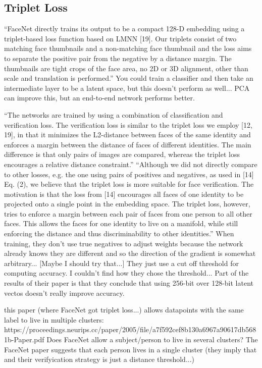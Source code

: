 \subsection{Triplet Loss}
``FaceNet directly trains
its output to be a compact 128-D embedding using a triplet-based loss function based on LMNN [19]. Our triplets consist of two matching face thumbnails and a non-matching
face thumbnail and the loss aims to separate the positive pair
from the negative by a distance margin. The thumbnails are
tight crops of the face area, no 2D or 3D alignment, other
than scale and translation is performed.''
You could train a classifier and then take an intermediate layer to be a latent space, but this doesn't perform as well...
PCA can improve this, but an end-to-end network performs better.
\cite{face_net}

``The networks are trained by using a combination of classification and verification loss. The verification
loss is similar to the triplet loss we employ [12, 19], in that it
minimizes the L2-distance between faces of the same identity and enforces a margin between the distance of faces of
different identities. The main difference is that only pairs of
images are compared, whereas the triplet loss encourages a
relative distance constraint.''
``Although we did not directly compare to other losses,
e.g. the one using pairs of positives and negatives, as used
in [14] Eq. (2), we believe that the triplet loss is more suitable for face verification. The motivation is that the loss
from [14] encourages all faces of one identity to be projected onto a single point in the embedding space. The
triplet loss, however, tries to enforce a margin between each
pair of faces from one person to all other faces. This allows the faces for one identity to live on a manifold, while
still enforcing the distance and thus discriminability to other
identities.''
When training, they don't use true negatives to adjust weights because the network already knows they are different and so the direction of the gradient is somewhat arbitrary...
[Maybe I should try that...]
They just use a cut off threshold for computing accuracy.
I couldn't find how they chose the threshold...
Part of the results of their paper is that they conclude that using 256-bit over 128-bit latent vectos doesn't really improve accuracy.

this paper (where FaceNet got triplet loss...) allows datapoints with the same label to live in multiple clusters:
https://proceedings.neurips.cc/paper/2005/file/a7f592cef8b130a6967a90617db5681b-Paper.pdf
Does FaceNet allow a subject/person to live in several clusters?
The FaceNet paper suggests that each person lives in a single cluster (they imply that and their verifyication strategy is just a distance threshold...)

